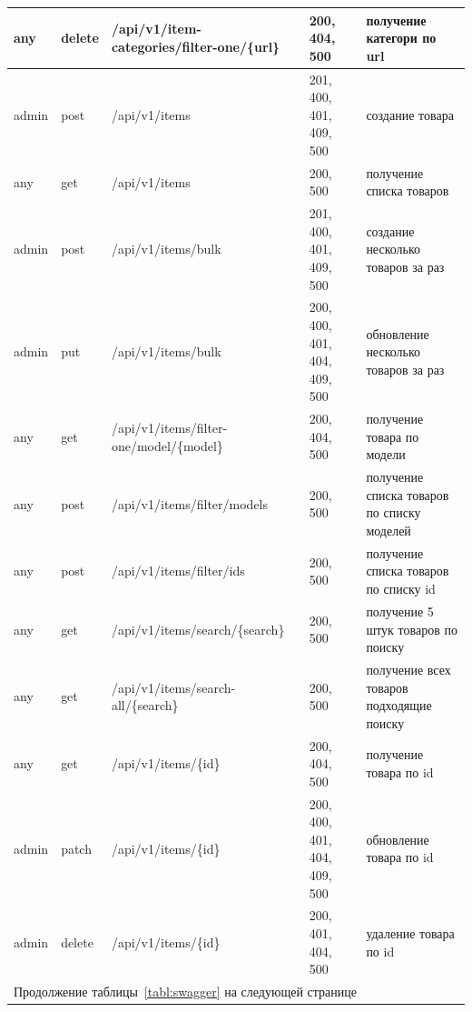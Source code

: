 \begin{table}
\begin{tabular}{|p{1cm}|p{1cm}|p{8.5cm}|p{4.8cm}|p{8.5cm}|}
        any & delete & /api/v1/item-categories/filter-one/\{url\} & 200, 404, 500 & получение категори по url \\ \hline 
        admin & post & /api/v1/items & 201, 400, 401, 409, 500 & создание товара \\ \hline 
        any & get & /api/v1/items & 200, 500 & получение списка товаров \\ \hline 
        admin & post & /api/v1/items/bulk & 201, 400, 401, 409, 500 & создание несколько товаров за раз \\ \hline 
        admin & put & /api/v1/items/bulk & 200, 400, 401, 404, 409, 500 & обновление несколько товаров за раз \\ \hline 
        any & get & /api/v1/items/filter-one/model/\{model\} & 200, 404, 500 & получение товара по модели \\ \hline 
        any & post & /api/v1/items/filter/models & 200, 500 & получение списка товаров по списку моделей \\ \hline
        any & post & /api/v1/items/filter/ids & 200, 500 & получение списка товаров по списку id \\ \hline  
        any & get & /api/v1/items/search/\{search\} & 200, 500 & получение 5 штук товаров по поиску \\ \hline 
        any & get & /api/v1/items/search-all/\{search\} & 200, 500 & получение всех товаров подходящие поиску \\ \hline 
        any & get & /api/v1/items/\{id\} & 200, 404, 500 & получение товара по id \\ \hline 
        admin & patch & /api/v1/items/\{id\} & 200, 400, 401, 404, 409, 500 & обновление товара по id \\ \hline 
        admin & delete & /api/v1/items/\{id\} & 200, 401, 404, 500 & удаление товара по id \\ \hline 
        \multicolumn{5}{l}{Продолжение таблицы~\ref{tabl:swagger} на следующей странице}
    \end{tabular}
\end{table}
